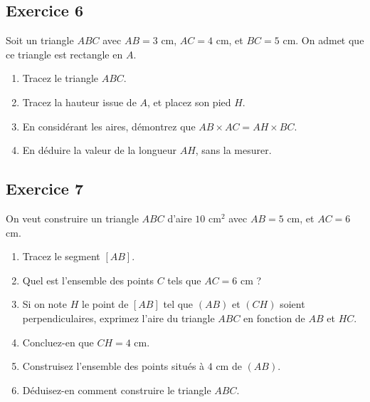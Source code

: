 \documentclass[14 pt]{extarticle}
\theoremstyle{plain}
\begin{document}
\subsection*{Exercice 6}
Soit un triangle $ABC$ avec $AB=3$ cm, $AC = 4$ cm, et $BC= 5$ cm. On admet que ce triangle est rectangle en $A$. 
\begin{enumerate}
\item Tracez le triangle $ABC$. 
\item Tracez la hauteur issue de $A$, et placez son pied $H$. 
\item En considérant les aires, démontrez que $AB \times AC = AH \times BC$. 
\item En déduire la valeur de la longueur $AH$, sans la mesurer. 
\end{enumerate}

\subsection*{Exercice 7}

On veut construire un triangle $ABC$ d'aire $10$ cm${}^2$ avec $AB= 5$ cm, et $AC= 6$ cm.

\begin{enumerate}
\item Tracez le segment $[AB]$.
\item Quel est l'ensemble des points $C$ tels que $AC=6$ cm ?
\item Si on note $H$ le point de $[AB]$ tel que $(AB)$ et $(CH)$ soient perpendiculaires, exprimez l'aire du triangle $ABC$ en fonction de $AB$ et $HC$. 
\item Concluez-en que $CH= 4$ cm. 
\item Construisez l'ensemble des points situés à $4$ cm de $(AB)$. 
\item Déduisez-en comment construire le triangle $ABC$. 
\end{enumerate} 





 

 	
\end{document}
